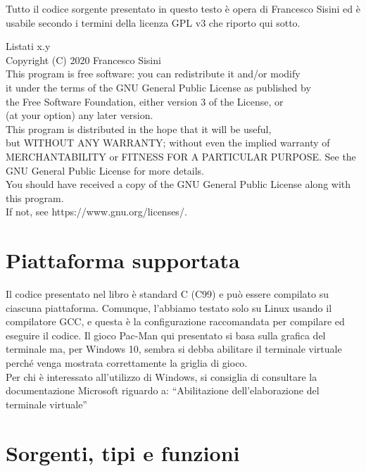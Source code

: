 \documentclass[8pt]{book}
\begin{document}
Tutto il codice sorgente presentato in questo testo è opera di Francesco Sisini ed è usabile secondo i termini della licenza GPL v3 che riporto qui sotto.

Listati x.y\\
Copyright (C) 2020 Francesco Sisini\\[2\baselineskip]This program is free software: you can redistribute it and/or modify\\
it under the terms of the GNU General Public License as published by\\
the Free Software Foundation, either version 3 of the License, or\\
(at your option) any later version.\\[2\baselineskip]This program is distributed in the hope that it will be useful,\\
but WITHOUT ANY WARRANTY; without even the implied warranty of\\
MERCHANTABILITY or FITNESS FOR A PARTICULAR PURPOSE. See the\\
GNU General Public License for more details.\\[2\baselineskip]You should have received a copy of the GNU General Public License
along with this program.\\ If not, see https://www.gnu.org/licenses/.\\

\newpage

\section*{Piattaforma supportata}

Il codice presentato nel libro è standard C (C99) e può essere compilato su ciascuna piattaforma. Comunque, l'abbiamo testato solo su Linux usando il compilatore GCC, e questa è la configurazione raccomandata per compilare ed eseguire il codice. Il gioco Pac-Man qui presentato si basa sulla grafica del terminale ma, per Windows 10, sembra si debba abilitare il terminale virtuale perché venga mostrata correttamente la griglia di gioco.\\
Per chi è interessato all'utilizzo di Windows, si consiglia di consultare la documentazione Microsoft riguardo a: ``Abilitazione dell'elaborazione del terminale virtuale''

\newpage
\section*{Sorgenti, tipi e funzioni}
\end{document}
